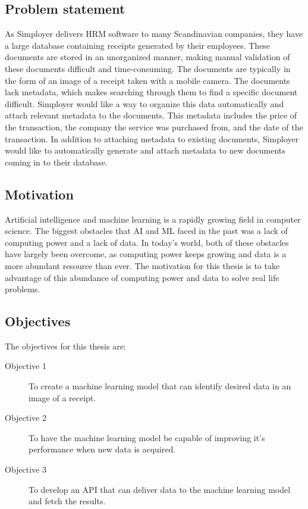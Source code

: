 \subsection{Problem statement}\label{subsec:problem-statement}
As Simployer delivers HRM software to many Scandinavian companies, they have a large database containing receipts generated by their employees.
These documents are stored in an unorganized manner, making manual validation of these documents difficult and time-consuming.
The documents are typically in the form of an image of a receipt taken with a mobile camera.
The documents lack metadata, which makes searching through them to find a specific document difficult.
Simployer would like a way to organize this data automatically and attach relevant metadata to the documents.
This metadata includes the price of the transaction, the company the service was purchased from, and the date of the transaction.
In addition to attaching metadata to existing documents, Simployer would like to automatically generate and attach metadata to new documents coming in to their database.

\subsection{Motivation}\label{subsec:motivation}
Artificial intelligence and machine learning is a rapidly growing field in computer science.
The biggest obstacles that AI and ML faced in the past was a lack of computing power and a lack of data.
In today's world, both of these obstacles have largely been overcome, as computing power keeps growing and data is a more abundant resource than ever.
The motivation for this thesis is to take advantage of this abundance of computing power and data to solve real life problems.

\subsection{Objectives}\label{subsec:objectives}
The objectives for this thesis are:
\begin{description}
    \item[Objective 1] To create a machine learning model that can identify desired data in an image of a receipt.
    \item[Objective 2] To have the machine learning model be capable of improving it's performance when new data is acquired.
    \item[Objective 3] To develop an API that can deliver data to the machine learning model and fetch the results.
\end{description}


